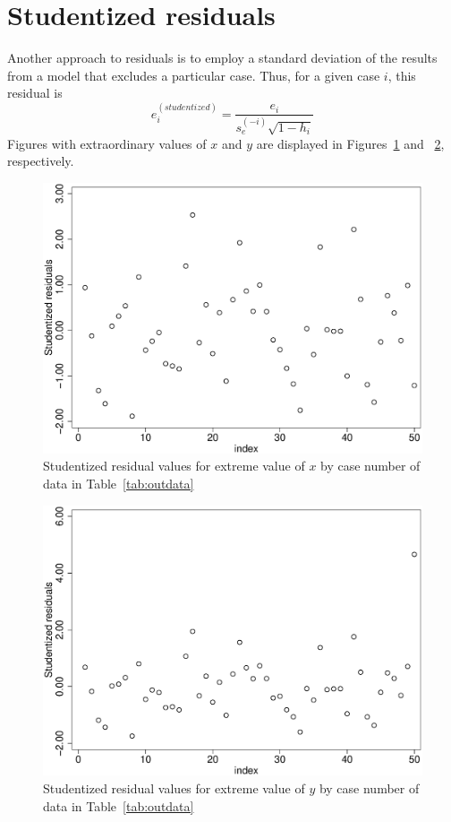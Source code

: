 \section{Studentized residuals}

Another approach to residuals is to employ a standard deviation of the results from a model that excludes a particular case. Thus, for a given case $i$, this residual is
\begin{equation}
e^{\left(studentized\right)}_i=\frac{e_i}{s^{\left(-i\right)}_e\sqrt{1-h_i}}
\end{equation}
Figures with extraordinary values of $x$ and $y$ are displayed in Figures~\ref{fig:xstudent} and ~\ref{fig:ystudent}, respectively.
\begin{figure}
   \centering
   \includegraphics[angle=0,
           width=.75\textwidth]{xout_student_index.eps}
   \caption{Studentized residual values for extreme value of $x$ by case number of data in Table~\ref{tab:outdata}}
  \label{fig:xstudent}
\end{figure}

\begin{figure}
   \centering
   \includegraphics[angle=0,
           width=.75\textwidth]{yout_student_index.eps}
   \caption{Studentized residual values for extreme value of $y$ by case number of data in Table~\ref{tab:outdata}}
  \label{fig:ystudent}
\end{figure}


